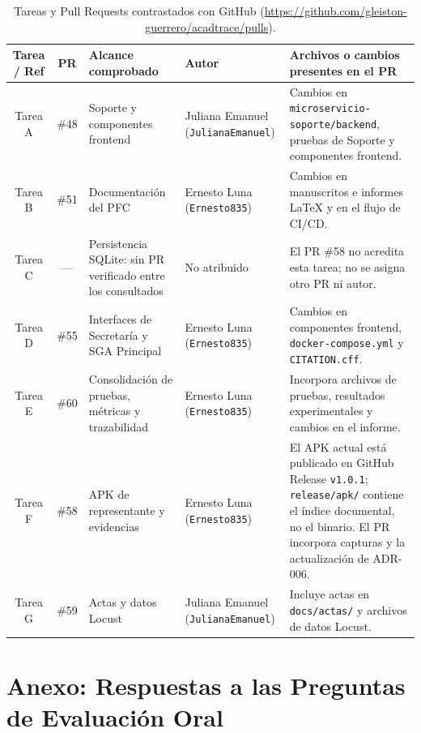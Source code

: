 \documentclass[11pt,a4paper]{article}
\begin{document}
\begin{table}[H]
\centering
\scriptsize
\renewcommand{\arraystretch}{1.22}
\caption{Tareas y Pull Requests contrastados con GitHub (\url{https://github.com/gleiston-guerrero/acadtrace/pulls}).}
\label{tab:peer-review}
\begin{tabularx}{\textwidth}{|c|c|p{3.1cm}|p{2.4cm}|X|}
\hline
\textbf{Tarea / Ref} & \textbf{PR} & \textbf{Alcance comprobado} & \textbf{Autor} & \textbf{Archivos o cambios presentes en el PR} \\
\hline
Tarea A & \#48 & Soporte y componentes frontend & Juliana Emanuel (\texttt{JulianaEmanuel}) & Cambios en \texttt{microservicio-soporte/backend}, pruebas de Soporte y componentes frontend. \\
\hline
Tarea B & \#51 & Documentación del PFC & Ernesto Luna (\texttt{Ernesto835}) & Cambios en manuscritos e informes LaTeX y en el flujo de CI/CD. \\
\hline
Tarea C & --- & Persistencia SQLite: sin PR verificado entre los consultados & No atribuido & El PR \#58 no acredita esta tarea; no se asigna otro PR ni autor. \\
\hline
Tarea D & \#55 & Interfaces de Secretaría y SGA Principal & Ernesto Luna (\texttt{Ernesto835}) & Cambios en componentes frontend, \texttt{docker-compose.yml} y \texttt{CITATION.cff}. \\
\hline
Tarea E & \#60 & Consolidación de pruebas, métricas y trazabilidad & Ernesto Luna (\texttt{Ernesto835}) & Incorpora archivos de pruebas, resultados experimentales y cambios en el informe. \\
\hline
Tarea F & \#58 & APK de representante y evidencias & Ernesto Luna (\texttt{Ernesto835}) & El APK actual está publicado en GitHub Release \texttt{v1.0.1}; \texttt{release/apk/} contiene el índice documental, no el binario. El PR incorpora capturas y la actualización de ADR-006. \\
\hline
Tarea G & \#59 & Actas y datos Locust & Juliana Emanuel (\texttt{JulianaEmanuel}) & Incluye actas en \texttt{docs/actas/} y archivos de datos Locust. \\
\hline
\end{tabularx}
\end{table}
\newpage



\newpage
\section*{Anexo: Respuestas a las Preguntas de Evaluaci\'on Oral}
\end{document}
